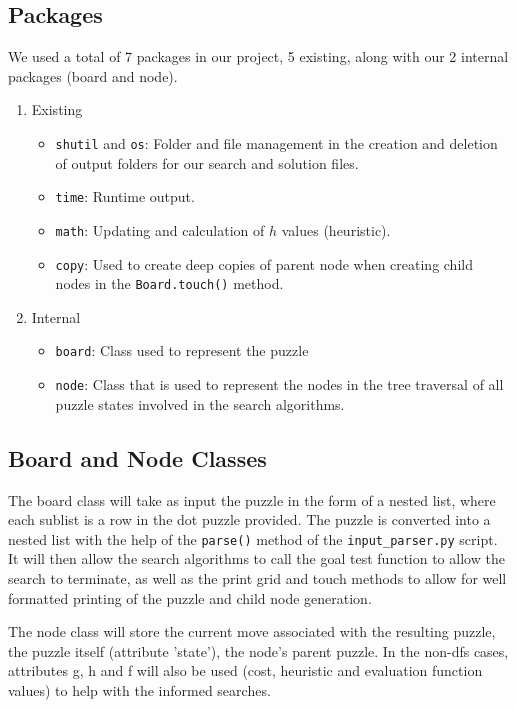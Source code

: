 \documentclass[runningheads]{llncs}
\begin{document}
\subsection{Packages}

We used a total of 7 packages in our project, 5 existing, along with our 2 internal packages (board and node). 

\begin{enumerate}
    \item Existing 
    \begin{itemize}
        \item \verb|shutil| and \verb|os|: Folder and file management in the creation and deletion of output folders for our search and solution files. 
        \item \verb|time|: Runtime output. 
        \item \verb|math|: Updating and calculation of $h$ values (heuristic).
        \item \verb|copy|: Used to create deep copies of parent node when creating child nodes in the \verb|Board.touch()| method.
    \end{itemize}
    \item Internal
    \begin{itemize}
        \item \verb|board|: Class used to represent the puzzle 
        \item \verb|node|: Class that is used to represent the nodes in the tree traversal of all puzzle states involved in the search algorithms.
    \end{itemize}
\end{enumerate}

\subsection{Board and Node Classes}

The board class will take as input the puzzle in the form of a nested list, where each sublist is a row in the dot puzzle provided. The puzzle is converted into a nested list with the help of the \verb|parse()| method of the \verb|input_parser.py| script. It will then allow the search algorithms to call the goal test function to allow the search to terminate, as well as the print grid and touch methods to allow for well formatted printing of the puzzle and child node generation.

The node class will store the current move associated with the resulting puzzle, the puzzle itself (attribute 'state'), the node's parent puzzle. In the non-dfs cases, attributes g, h and f will also be used (cost, heuristic and evaluation function values) to help with the informed searches.
\end{document}
